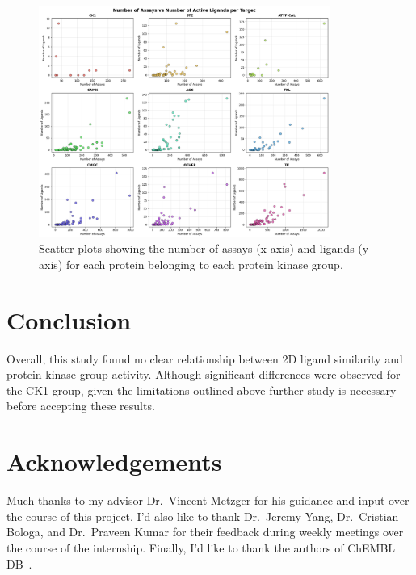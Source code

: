 \documentclass[11pt]{article}
\begin{document}
\begin{figure}[H]
    \centering
    \includegraphics[width=0.85\textwidth]{../figures/assay_vs_ligand.png}
    \caption{Scatter plots showing the number of assays (x-axis) and ligands (y-axis) for each protein belonging to each protein kinase group.}
    \label{fig:assay_vs_ligand_plot}
\end{figure}

\section{Conclusion}
Overall, this study found no clear relationship between 2D ligand similarity and protein kinase group activity. Although significant differences were observed for the CK1 group, given the limitations outlined above further study is necessary before accepting these results. 

\section{Acknowledgements}
Much thanks to my advisor Dr.~Vincent Metzger for his guidance and input over the course of this project. I'd also like to thank Dr.~Jeremy Yang, Dr.~Cristian Bologa, and Dr.~Praveen Kumar for their feedback during weekly meetings over the course of the internship. Finally, I'd like to thank the   authors of ChEMBL DB~\cite{chembl_db_2023}.


\end{document}
